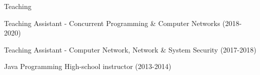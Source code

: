         \begin{xSection}{Teaching}

            \medskip
            \small
            \begin{myitemize}
                \item Teaching Assistant - Concurrent Programming \& Computer Networks (2018-2020)
                \item Teaching Assistant - Computer Network, Network \& System Security (2017-2018)
                \item Java Programming High-school instructor (2013-2014)
            \end{myitemize}

        \end{xSection}

        \medskip

